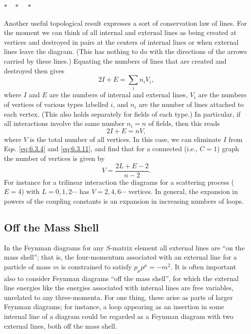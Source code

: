 \begin{center}
$*\quad *\quad *$
\end{center}

Another useful topological result expresses a sort of conservation law of
lines. For the moment we can think of all internal and external lines as being
created at vertices and destroyed in pairs at the centers of internal lines or
when external lines leave the diagram. (This has nothing to do with the
directions of the arrows carried by these lines.) Equating the numbers of lines
that are created and destroyed then gives
\begin{equation}
2I+E=\sum_i n_iV_i,
\tag{6.3.11}
\label{eq:6.3.11}
\end{equation}
where $I$ and $E$ are the numbers of internal and external lines, $V_i$ are the
numbers of vertices of various types labelled $i$, and $n_i$ are the number of
lines attached to each vertex. (This also holds separately for fields of each
type.) In particular, if all interactions involve the same number $n_i=n$ of
fields, then this reads
\begin{equation}
2I+E=nV,
\tag{6.3.12}
\label{eq:6.3.12}
\end{equation}
where $V$ is the total number of all vertices. In this case, we can eliminate
$I$ from Eqs. \eqref{eq:6.3.4} and \eqref{eq:6.3.11}, and find that for a connected (i.e.,
$C=1$) graph the number of vertices is given by
\begin{equation}
V=\frac{2L+E-2}{n-2}.
\tag{6.3.13}
\label{eq:6.3.13}
\end{equation}
For instance for a trilinear interaction the diagrams for a scattering process
($E=4$) with $L=0,1,2\cdots$ has $V=2,4,6\cdots$ vertices. In general, the
expansion in powers of the coupling constants is an expansion in increasing
numbers of loops.

\subsection{Off the Mass Shell}

In the Feynman diagrams for any $S$-matrix element all external lines are ``on
the mass shell''; that is, the four-momentum associated with an external line
for a particle of mass $m$ is constrained to satisfy $p_\mu p^\mu=-m^2$. It is
often important also to consider Feynman diagrams ``off the mass shell'', for
which the external line energies like the energies associated with internal
lines are free variables, unrelated to any three-momenta. For one thing, these
arise as parts of larger Feynman diagrams; for instance, a loop appearing as an
insertion in some internal line of a diagram could be regarded as a Feynman
diagram with two external lines, both off the mass shell.

